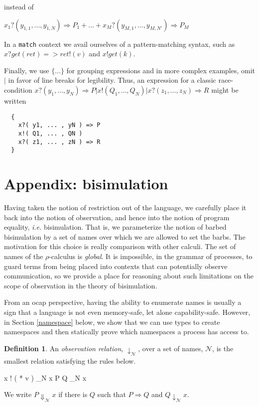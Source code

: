 \documentclass[]{amsart}
\newcommand{\id}[1]{\texttt{#1}}
\newcommand{\juxtap}{\mathbin{\id{|}}}
\newcommand{\nameeq}{\mathbin{\equiv_N}}
\newcommand{\binpar}[2]{#1 \juxtap #2}
\newcommand{\outputp}[2]{#1 ! ( * #2 )}
\newcommand{\wred}{\Rightarrow}
\theoremstyle{definition}
\newtheorem{defn}[thm]{Definition}
\theoremstyle{remark}
\numberwithin{equation}{subsection}
\newcommand{\pic}{$\pi$-calculus}
\newcommand{\rhoc}{$\rho$-calculus}
\begin{document}
instead of 

$x_1?( y_{1,1}, \ldots, y_{1,N} ) \Rightarrow P_1 + \ldots + x_M?( y_{M,1},\ldots, y_{M,N'} ) \Rightarrow P_M$

In a \texttt{match} context we avail ourselves of a pattern-matching
syntax, such as $x ? get( ret ) => ret!( v )$ and $x ! get( k )$.

Finally, we use $\{ \ldots \}$ for grouping expressions and in more complex examples, omit
$\binpar{}{}$ in favor of line breaks for legibility. Thus, an expression for a classic race-condition $\binpar{ x?( y_1, \ldots, y_N ) \Rightarrow P}{\binpar{x!( Q_1, \ldots, Q_N )}{ x?( z_1, \ldots, z_N ) \Rightarrow R}}$ might be written
\begin{lstlisting}
  {
    x?( y1, ... , yN ) => P
    x!( Q1, ... , QN )
    x?( z1, ... , zN ) => R
  }
\end{lstlisting}

\section{Appendix: bisimulation}

Having taken the notion of restriction out of the language, we
carefully place it back into the notion of observation, and hence into
the notion of program equality, {\em i.e.} bisimulation. That is, we
parameterize the notion of barbed bisimulation by a set of names over
which we are allowed to set the barbs. The motivation for this choice
is really comparison with other calculi. The set of names of the
{\rhoc} is \textit{global}. It is impossible, in the grammar of
processes, to guard terms from being placed into contexts that can
potentially observe communication, so we provide a place for
reasoning about such limitations on the scope of observation in the
theory of bisimulation.

From an ocap perspective, having the ability to enumerate names is
usually a sign that a language is not even memory-safe, let alone
capability-safe.  However, in Section \ref{namespace} below, we show
that we can use types to create namespaces and then statically prove
which namespaces a process has access to.


\begin{defn}
An \emph{observation relation}, $\downarrow_{\mathcal N}$, over a set
of names, $\mathcal N$, is the smallest relation satisfying the rules
below.

\infrule[Out-barb]{y \in {\mathcal N}, \; x \nameeq y}
		  {\outputp{x}{v} \downarrow_{\mathcal N} x}
		  {\binpar{P}{Q} \downarrow_{\mathcal N} x}

We write $P \Downarrow_{\mathcal N} x$ if there is $Q$ such that 
$P \wred Q$ and $Q \downarrow_{\mathcal N} x$.
\end{defn}
\end{document}
